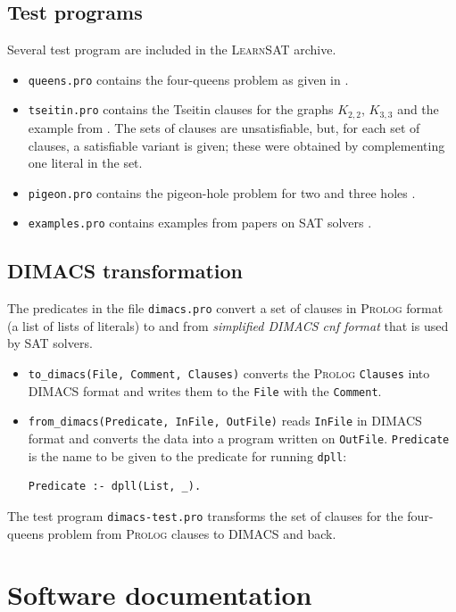 \documentclass[11pt]{article}
\newcommand*{\p}[1]{\textup{\texttt{#1}}}
\newcommand*{\ls}{\textsc{LearnSAT}}
\newcommand*{\pl}{\textsc{Prolog}}
\begin{document}
\subsection{Test programs}

Several test program are included in the \ls{} archive.

\begin{itemize}
\item \p{queens.pro} contains the four-queens problem as given in
\cite[Section 6.4]{mlcs}.
\item \p{tseitin.pro} contains the Tseitin clauses for the graphs
$K_{2,2}$, $K_{3,3}$ and the example from \cite[Section 4.5]{mlcs}. The
sets of clauses are unsatisfiable, but, for each set of clauses, a
satisfiable variant is given; these were obtained by complementing one
literal in the set.
\item \p{pigeon.pro} contains the pigeon-hole problem for
two and three holes \cite[Exercise 6.4]{mlcs}.
\item \p{examples.pro} contains examples from papers on SAT
solvers \cite{mz,mlm,ms}.
\end{itemize}


\subsection{DIMACS transformation}

The predicates in the file \p{dimacs.pro} convert a set of clauses in
\pl{} format (a list of lists of literals) to and from \emph{simplified
DIMACS cnf format} that is used by SAT solvers.
\begin{itemize}
\item \p{to\_dimacs(File, Comment, Clauses)} converts the \pl{}
\p{Clauses} into DIMACS format and writes them to the \p{File} with the
\p{Comment}.
\item \p{from\_dimacs(Predicate, InFile, OutFile)} reads \p{InFile} in
DIMACS format and converts the data into a program written on
\p{OutFile}. \p{Predicate} is the name to be given to the predicate for
running \p{dpll}:
\begin{verbatim}
Predicate :- dpll(List, _).
\end{verbatim}
\end{itemize}
The test program \p{dimacs-test.pro} transforms the set of clauses for
the four-queens problem from \pl{} clauses to DIMACS and back.

\newpage

\section{Software documentation}
\end{document}
